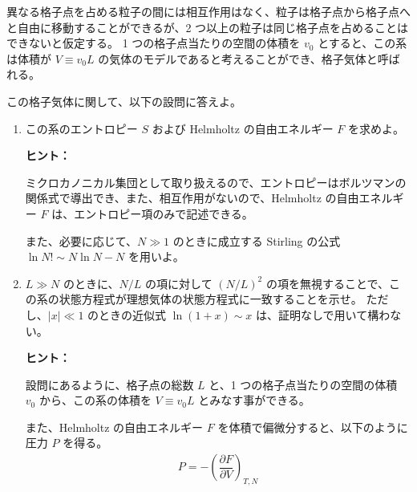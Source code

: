 \documentclass[uplatex,dvipdfmx,a4paper,11pt]{jsarticle}
\begin{document}
異なる格子点を占める粒子の間には相互作用はなく、粒子は格子点から格子点へと自由に移動することができるが、2 つ以上の粒子は同じ格子点を占めることはできないと仮定する。
1 つの格子点当たりの空間の体積を $v_0$ とすると、この系は体積が $V \equiv v_0 L$ の気体のモデルであると考えることができ、格子気体と呼ばれる。

この格子気体に関して、以下の設問に答えよ。


\begin{enumerate}
\setlength{\parskip}{0cm} %
\setlength{\itemsep}{0.3cm} %

\item
この系のエントロピー $S$ および Helmholtz の自由エネルギー $F$ を求めよ。

\begin{itembox}[l]{{\bf ヒント：}}

ミクロカノニカル集団として取り扱えるので、エントロピーはボルツマンの関係式で導出でき、また、相互作用がないので、Helmholtz の自由エネルギー $F$ は、エントロピー項のみで記述できる。

また、必要に応じて、$N \gg 1$ のときに成立する Stirling の公式 $\ln N! \sim N \ln N - N$ を用いよ。
\end{itembox}

\color{black}

\item
$L \gg N$ のときに、$N/L$ の項に対して $(N/L)^2$ の項を無視することで、この系の状態方程式が理想気体の状態方程式に一致することを示せ。
ただし、$\vert x \vert \ll 1$ のときの近似式 $\ln (1+x) \sim x$ は、証明なしで用いて構わない。

\begin{itembox}[l]{{\bf ヒント：}}

設問にあるように、格子点の総数 $L$ と、1 つの格子点当たりの空間の体積 $v_0$ から、この系の体積を $V \equiv v_0 L$ とみなす事ができる。

また、Helmholtz の自由エネルギー $F$ を体積で偏微分すると、以下のように圧力 $P$ を得る。
\begin{align*}
P = -\left( \dfrac{\partial F}{\partial V} \right)_{T,N} 
\end{align*}

\end{itembox}


\end{enumerate}
\end{document}
